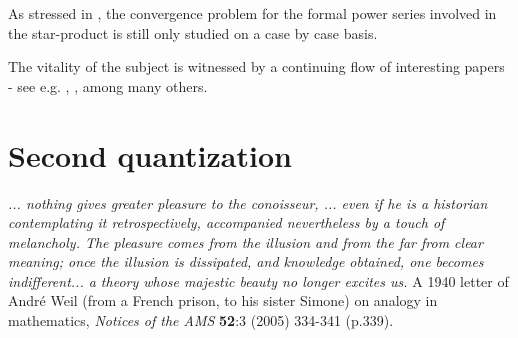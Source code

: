 As stressed in \cite{GW}, the convergence problem for the formal power series involved in the star-product 
is still only studied on a case by case basis.

The vitality of the subject is witnessed by a continuing flow of interesting papers - see e.g. \cite{C07}, \cite{CFR}, \cite{LW} among many others.
\bigskip

\section{Second quantization}
\setcounter{equation}{0}
\renewcommand\theequation{\thesection.\arabic{equation}}

\hfill\begin{minipage}{.7\linewidth}
{\it ... nothing gives greater pleasure to the conoisseur, ... even if he is a historian contemplating it retrospectively,
accompanied nevertheless by a touch of melancholy. The pleasure comes from the illusion and from the far from clear meaning;
once the illusion is dissipated, and knowledge obtained, one becomes indifferent... a theory whose majestic beauty no longer 
excites us.} A 1940 letter of Andr\'e Weil (from a French prison, to his sister Simone) on analogy in mathematics, 
{\it Notices of the AMS} {\bf 52}:3 (2005) 334-341 (p.339).
\end{minipage}

\smallskip

